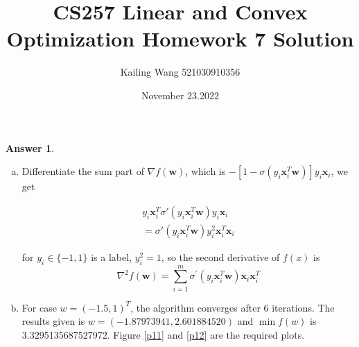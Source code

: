 \documentclass{article}
\theoremstyle{definition}
\newtheorem{ans}{Answer}
\begin{document}
	\title{CS257 Linear and Convex Optimization Homework 7 Solution}
	\author{Kailing Wang 521030910356}
	\date{November 23.2022}
	\maketitle
	\begin{ans}
		~
		
		\begin{enumerate}[(a)]
			\item Differentiate the sum part of $\nabla f(\boldsymbol{w})$, which is $-\left[1-\sigma\left(y_i \boldsymbol{x}_i^T \boldsymbol{w}\right)\right] y_i \boldsymbol{x}_i$, we get
			
			$$
			\begin{aligned}
			y_i \boldsymbol{x}^T_i\sigma\prime\left(y_i \boldsymbol{x}_i^T \boldsymbol{w}\right)y_i\boldsymbol{x}_i\\
			=\sigma\prime\left(y_i \boldsymbol{x}_i^T \boldsymbol{w}\right)y_i^2\boldsymbol{x}^T_i\boldsymbol{x}_i
			\end{aligned}
			$$
			
			for $y_i\in \{-1,1\}$ is a label, $y_i^2=1$, so the second derivative of $f(x)$ is
			$$
			\nabla^2 f(\boldsymbol{w})=\sum_{i=1}^m \sigma^{\prime}\left(y_i \boldsymbol{x}_i^T \boldsymbol{w}\right) \boldsymbol{x}_i \boldsymbol{x}_i^T
			$$
			\item For case $w=(-1.5,1)^T$, the algorithm converges after 6 iterations. The results given is $w=(-1.87973941,2.601884520)$ and $\min f(w)$ is 3.3295135687527972. Figure \ref{p11} and \ref{p12} are the required plots. 
			

\end{enumerate}
\end{ans}
\end{document}
